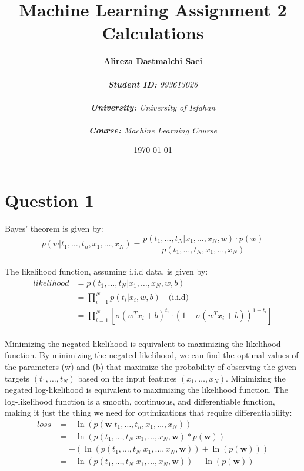 \documentclass{article}
\title{\textbf{Machine Learning Assignment 2 Calculations}}
\author{\textbf{Alireza Dastmalchi Saei}\\\\
    \textit{\textbf{Student ID:} 993613026}\\\\
    \textit{\textbf{University:} University of Isfahan}\\\\
    \textit{\textbf{Course:} Machine Learning Course}\\}
\date{\today}
\begin{document}
\posttitle{\end{center}\vspace{3\baselineskip}}

\maketitle
\pagebreak

\section{Question 1}
Bayes' theorem is given by:
\[
p(w | t_1, \ldots, t_n, x_1, \ldots, x_N) = \frac{p(t_1, \ldots, t_N | x_1, \ldots, x_N, w) \cdot p(w)}{p(t_1, \ldots, t_N, x_1, \ldots, x_N)}
\]
\\[5ex]
The likelihood function, assuming i.i.d data, is given by:
\begin{align*}
likelihood &= p(t_1, \ldots, t_N | x_1, \ldots, x_N, w, b) \\
&= \prod_{i=1}^{N} p(t_i | x_i, w, b) \quad \text{(i.i.d)} \\
&= \prod_{i=1}^{N} \left[ \sigma(w^T x_i + b)^{t_i} \cdot (1 - \sigma(w^T x_i + b))^{1 - t_i} \right]
\end{align*}
\\[5ex]
Minimizing the negated likelihood is equivalent to maximizing the likelihood function. By minimizing the negated likelihood, we can find the optimal values of the parameters (w) and (b) that maximize the probability of observing the given targets $(t_1, \ldots, t_N)$ based on the input features $(x_1, \ldots, x_N)$. Minimizing the negated log-likelihood is equivalent to maximizing the likelihood function. The log-likelihood function is a smooth, continuous, and differentiable function, making it just the thing we need for optimizations that require differentiability:
\[
\begin{aligned}
loss &= - \ln(p(\mathbf{w} | t_1, \ldots, t_n, x_1, \ldots, x_N)) \\
&= - \ln(p(t_1, \ldots, t_N | x_1, \ldots, x_N, \mathbf{w}) * p(\mathbf{w})) \\
&= -(\ln(p(t_1, \ldots, t_N | x_1, \ldots, x_N, \mathbf{w})) + \ln(p(\mathbf{w}))) \\
&= - \ln(p(t_1, \ldots, t_N | x_1, \ldots, x_N, \mathbf{w})) - \ln(p(\mathbf{w}))
\end{aligned}
\]
\end{document}
